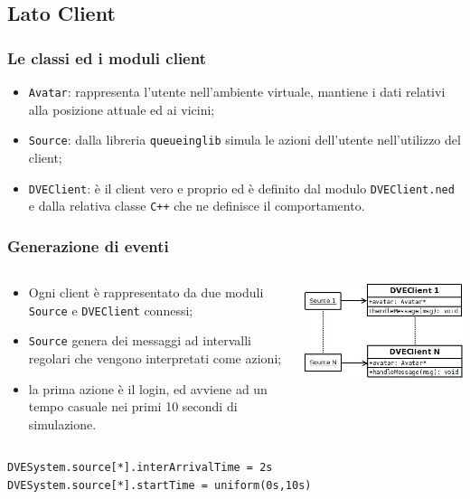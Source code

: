 \subsection*{Lato Client}

\begin{frame}
\frametitle{Le classi ed i moduli client}
\begin{itemize}[<+->]
\item
\alert{\texttt{Avatar}}:
rappresenta l'utente nell'ambiente virtuale, mantiene
i dati relativi alla posizione attuale ed ai vicini;
\item
\alert{\texttt{Source}}:
dalla libreria
\texttt{queueinglib} simula le azioni
dell'utente nell'utilizzo del client;
\item
\alert{\texttt{DVEClient}}:
è il client vero e proprio ed è definito dal modulo \texttt{DVEClient.ned} e
dalla relativa classe \texttt{C++} che ne definisce il comportamento.
\end{itemize}
\end{frame}

\begin{frame}[fragile]
\frametitle{Generazione di eventi}
\begin{columns}
\begin{column}{0.65\textwidth}
\begin{block}{}
\begin{itemize}
\item
Ogni client è rappresentato da due moduli \alert{\texttt{Source}} e
\alert{\texttt{DVEClient}} connessi;
\item
\texttt{Source} genera dei messaggi ad intervalli regolari che vengono
interpretati come azioni;
\item
la prima azione è il login, ed avviene ad un tempo
casuale nei primi 10 secondi di simulazione.
\end{itemize}
\end{block}
\end{column}
\begin{column}{0.35\textwidth}
\begin{center}
\includegraphics[scale=.45]{source.jpeg}
\end{center}
\end{column}
\end{columns}
\begin{center}
\begin{lstlisting}[title = {\texttt{omnetpp.ini}}]
DVESystem.source[*].interArrivalTime = 2s
DVESystem.source[*].startTime = uniform(0s,10s)
\end{lstlisting}
\end{center}
\end{frame}

